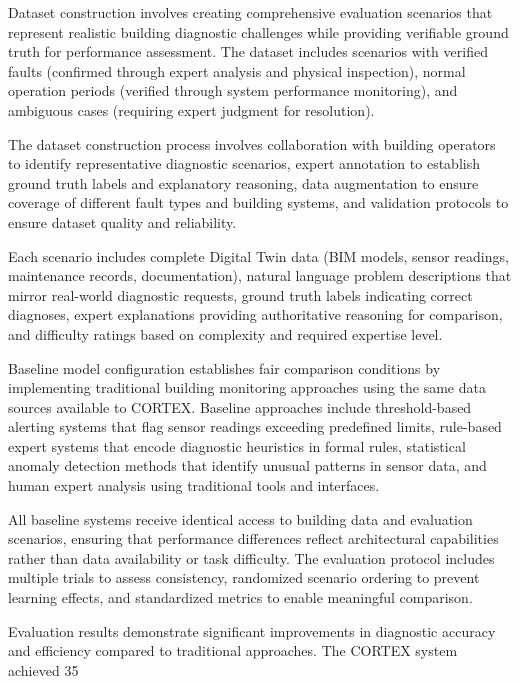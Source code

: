 Dataset construction involves creating comprehensive evaluation scenarios that represent realistic building diagnostic challenges while providing verifiable ground truth for performance assessment. The dataset includes scenarios with verified faults (confirmed through expert analysis and physical inspection), normal operation periods (verified through system performance monitoring), and ambiguous cases (requiring expert judgment for resolution).

The dataset construction process involves collaboration with building operators to identify representative diagnostic scenarios, expert annotation to establish ground truth labels and explanatory reasoning, data augmentation to ensure coverage of different fault types and building systems, and validation protocols to ensure dataset quality and reliability.

Each scenario includes complete Digital Twin data (BIM models, sensor readings, maintenance records, documentation), natural language problem descriptions that mirror real-world diagnostic requests, ground truth labels indicating correct diagnoses, expert explanations providing authoritative reasoning for comparison, and difficulty ratings based on complexity and required expertise level.

Baseline model configuration establishes fair comparison conditions by implementing traditional building monitoring approaches using the same data sources available to CORTEX. Baseline approaches include threshold-based alerting systems that flag sensor readings exceeding predefined limits, rule-based expert systems that encode diagnostic heuristics in formal rules, statistical anomaly detection methods that identify unusual patterns in sensor data, and human expert analysis using traditional tools and interfaces.

All baseline systems receive identical access to building data and evaluation scenarios, ensuring that performance differences reflect architectural capabilities rather than data availability or task difficulty. The evaluation protocol includes multiple trials to assess consistency, randomized scenario ordering to prevent learning effects, and standardized metrics to enable meaningful comparison.

Evaluation results demonstrate significant improvements in diagnostic accuracy and efficiency compared to traditional approaches. The CORTEX system achieved 35%

